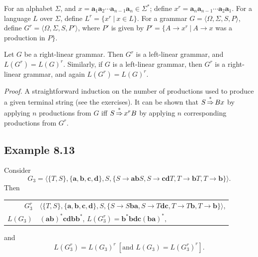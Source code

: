 \begin{dfn}\label{dfn-8.12}
For an alphabet $\Sigma$, and $x=\pmb{a}_1\pmb{a}_2\cdots\pmb{a}_{n-1}\pmb{a}_n
\in\Sigma^*$; define $x^r=\pmb{a}_n\pmb{a}_{n-1}\cdots\pmb{a}_2\pmb{a}_1$. For a
language $L$ over $\Sigma$, define $L^r=\{x^r\ |\ x\in L\}$. For a grammar $G =
\langle\Omega,\Sigma,S,P\rangle$, define $G^r=\langle\Omega,\Sigma,S,P'\rangle$,
where $P'$ is given by $P'=\{A\rightarrow x^r\ |\ A\rightarrow x$ was a production
in $P\}$.
\end{dfn}

\begin{lmm}\label{lmm-8.3}
Let $G$ be a right-linear grammar. Then $G^r$ is a left-linear grammar, and
$L(G^r) = L(G)^r$. Similarly, if $G$ is a left-linear grammar, then $G^r$ is a
right-linear grammar, and again $L(G^r) = L(G)^r$.

\emph{Proof.} A straightforward induction on the number of productions used to
produce a given terminal string (see the exercises). It can be shown that $S 
 \operatorname{\overset{*}{\Rightarrow}} Bx$ by applying $n$ productions from $G$ iff $S \operatorname{\overset{*}{\Rightarrow}} x^rB$
by applying $n$ corresponding productions from $G^r$.
\end{lmm}

\subsection*{Example 8.13}

Consider
\[ G_3=\langle\{T,S\},\{\pmb{a},\pmb{b},\pmb{c},\pmb{d}\},S,\{S\rightarrow
	\pmb{ab}S,S\rightarrow\pmb{cd}T,T\rightarrow\pmb{b}T,T\rightarrow
	\pmb{b}\}\rangle. \]
Then
\begin{center}\begin{tabular}{r@{ = }l}
$G_3^r$ & $\langle\{T, S\},\{\pmb{a},\pmb{b},\pmb{c},\pmb{d}\},S,\{S\rightarrow
	S\pmb{ba},S\rightarrow T\pmb{dc},T\rightarrow T\pmb{b},T\rightarrow
	\pmb{b}\}\rangle$, \\
$L(G_3)$ & $(\pmb{ab})^*\pmb{cdbb}^*$, $L(G^r_3)=\pmb{b}^*\pmb{bdc}(\pmb{ba})^*,$
\end{tabular}\end{center}
and
\[ L(G^r_3) = L(G_3)^r\ [\text{and }L(G_3) = L(G^r_3)^r]. \]

